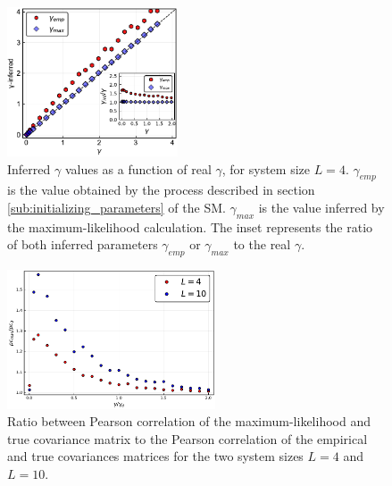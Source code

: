\documentclass[preprint,amsmath,amssymb,superscriptaddress,showpacs,pre]{revtex4-1}
\begin{document}
\begin{figure}[!htb]
	\centering
	\includegraphics[keepaspectratio=true,width=0.45\textwidth]{Figures/scatter_gamma_L4_100.pdf}
	\caption{Inferred $\gamma$ values as a function of real $\gamma$, for system size $L=4$. $\gamma_{emp}$ is the value obtained by the process described in section \ref{sub:initializing_parameters} of the SM. $\gamma_{max}$ is the value inferred by the maximum-likelihood calculation. 
	The inset represents the ratio of both inferred parameters $\gamma_{emp}$ or $\gamma_{max}$ to the real $\gamma$.}
	\label{fig:scatter_gamma_L4}
\end{figure}


\begin{figure}[!htb]
	\centering
	\includegraphics[keepaspectratio=true,width=0.55\textwidth]{Figures/Pearson_correlation_rate_full_range.pdf}
	\caption{  Ratio between Pearson correlation of the  maximum-likelihood  and true covariance  matrix to the Pearson correlation of the  empirical and true covariances matrices for the two system sizes $L=4$ and $L=10$.}
	\label{fig:pearson_corr_comp_L4}
\end{figure}
\end{document}
